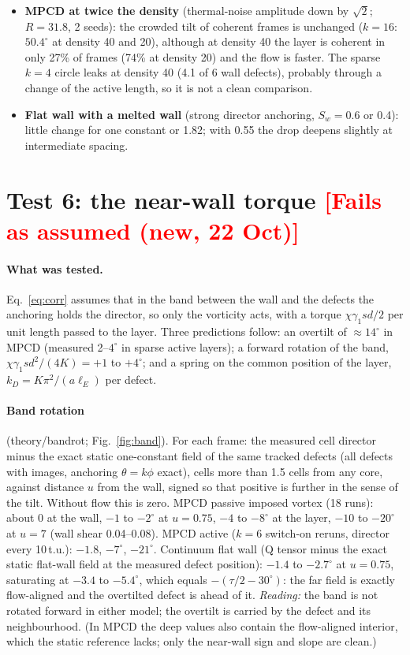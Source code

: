 \documentclass[11pt,a4paper]{article}
\newcommand{\verdict}[2]{\textbf{\textcolor{#1}{[#2]}}}
\begin{document}
\begin{itemize}
\item \textbf{MPCD at twice the density} (thermal-noise amplitude down by $\sqrt2$; $R=31.8$, 2 seeds): the crowded tilt of coherent frames is unchanged ($k=16$: $50.4^\circ$ at density 40 and 20), although at density 40 the layer is coherent in only 27\% of frames (74\% at density 20) and the flow is faster. The sparse $k=4$ circle leaks at density 40 (4.1 of 6 wall defects), probably through a change of the active length, so it is not a clean comparison.
\item \textbf{Flat wall with a melted wall} (strong director anchoring, $S_w=0.6$ or 0.4): little change for one constant or 1.82; with 0.55 the drop deepens slightly at intermediate spacing.
\end{itemize}

\section{Test 6: the near-wall torque \verdict{red}{Fails as assumed (new, 22 Oct)}}

\paragraph{What was tested.} Eq.~\eqref{eq:corr} assumes that in the band between the wall and the defects the anchoring holds the director, so only
the vorticity acts, with a torque $\chi\gamma_1 s d/2$ per unit length passed to the layer. Three predictions follow: an overtilt of $\approx14^\circ$ in MPCD
(measured 2--$4^\circ$ in sparse active layers); a forward rotation of the band, $\chi\gamma_1sd^2/(4K)=+1$ to $+4^\circ$; and a spring on the common position of the
layer, $k_D=K\pi^2/(a\ell_E)$ per defect.

\paragraph{Band rotation} (theory/bandrot; Fig.~\ref{fig:band}). For each frame: the measured cell director minus the exact static one-constant field of
the same tracked defects (all defects with images, anchoring $\theta=k\phi$ exact), cells more than 1.5 cells from any core, against distance $u$ from the
wall, signed so that positive is further in the sense of the tilt. Without flow this is zero. MPCD passive imposed vortex (18 runs): about 0 at the wall,
$-1$ to $-2^\circ$ at $u=0.75$, $-4$ to $-8^\circ$ at the layer, $-10$ to $-20^\circ$ at $u=7$ (wall shear 0.04--0.08). MPCD active ($k=6$ switch-on reruns, director every
10\,t.u.): $-1.8$, $-7^\circ$, $-21^\circ$. Continuum flat wall (Q tensor minus the exact static flat-wall field at the measured defect position): $-1.4$ to $-2.7^\circ$
at $u=0.75$, saturating at $-3.4$ to $-5.4^\circ$, which equals $-(\tau/2-30^\circ)$: the far field is exactly flow-aligned and the overtilted defect is ahead of it.
\emph{Reading:} the band is not rotated forward in either model; the overtilt is carried by the defect and its neighbourhood. (In MPCD the deep values also
contain the flow-aligned interior, which the static reference lacks; only the near-wall sign and slope are clean.)
\end{document}
